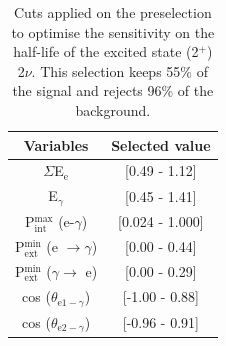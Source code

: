 \documentclass[main.tex]{subfiles}
\begin{document}
\begin{table}[h!]
\centering
\begin{tabular}{c|c}
Variables & Selected value \\
\toprule
$\Sigma$E$_{\text{e}}$ & [0.49 - 1.12] \\
E$_{\gamma}$    & [0.45 - 1.41] \\
P$_{\text{int}}^{\text{max}}$ (e-$\gamma$) & [0.024 - 1.000] \\
P$_{\text{ext}}^{\text{min}}$ (e $\rightarrow \gamma$) & [0.00 - 0.44] \\
P$_{\text{ext}}^{\text{min}}$ ($\gamma \rightarrow$ e) & [0.00 - 0.29] \\
cos ($\theta_{\text{e1}-\gamma}$) & [-1.00 - 0.88] \\
cos ($\theta_{\text{e2}-\gamma}$) & [-0.96 - 0.91] \\
\bottomrule
\end{tabular}
\caption{Cuts applied on the preselection to optimise the sensitivity on the half-life of the excited state (2$^+$) 2$\nu$. This selection keeps 55\% of the signal and rejects 96\% of the background.}
\label{tab:Cuts2nu2Plus250keV}
\end{table}
\end{document}
